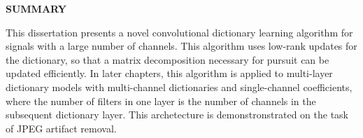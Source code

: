 \clearpage
\begin{centering}
\textbf{SUMMARY}\\
\vspace{\baselineskip}
\end{centering}

This dissertation presents a novel convolutional dictionary learning algorithm for signals with a large number of channels. This algorithm uses low-rank updates for the dictionary, so that a matrix decomposition necessary for pursuit can be updated efficiently. In later chapters, this algorithm is applied to multi-layer dictionary models with multi-channel dictionaries and single-channel coefficients, where the number of filters in one layer is the number of channels in the subsequent dictionary layer. This archetecture is demonstronstrated on the task of JPEG artifact removal.


